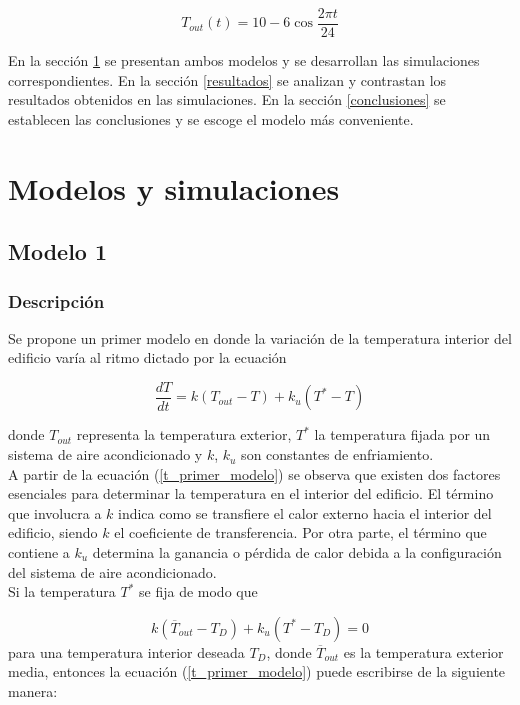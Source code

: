 \documentclass{sig-alternate}
\begin{document}
\begin{equation}
\label{t_exterior}
T_{out} (t) = 10 - 6 \cos\frac{2 \pi t}{24}
\end{equation}

En la secci\'{o}n \ref{modelosysimulaciones} se presentan ambos modelos y
se desarrollan las simulaciones correspondientes.
En la secci\'{o}n \ref{resultados} se analizan y contrastan los resultados
obtenidos en las simulaciones.
En la secci\'{o}n \ref{conclusiones} se establecen las conclusiones y se
escoge el modelo m\'{a}s conveniente.

\section{Modelos y simulaciones}\label{modelosysimulaciones}

\subsection{Modelo 1}

\subsubsection{Descripci\'{o}n}

Se propone un primer modelo en donde la variaci\'{o}n de la temperatura interior
del edificio var\'{i}a al ritmo dictado por la ecuaci\'{o}n

\begin{equation}
\label{t_primer_modelo}
\frac{dT}{dt} = k ( T_{out} - T ) + k_{u} ( T^{*} - T )
\end{equation}

donde $T_{out}$ representa la temperatura exterior, $T^{*}$ la temperatura
fijada por un sistema de aire acondicionado y $k$, $k_{u}$ son constantes
de enfriamiento. \\
A partir de la ecuaci\'{o}n (\ref{t_primer_modelo}) se observa que existen dos
factores esenciales para determinar la temperatura en el interior del edificio.
El t\'{e}rmino que involucra a $k$ indica como se
transfiere el calor externo hacia el interior del edificio, siendo $k$ el
coeficiente de transferencia. Por otra parte, el t\'{e}rmino que contiene a $k_{u}$
 determina la ganancia o p\'{e}rdida de calor debida a la configuraci\'{o}n del 
sistema de aire acondicionado. \\
Si la temperatura $T^{*}$ se fija de modo que 

\begin{equation}
\label{t_fijada}
k ( \overline{T}_{out} - T_{D})
+ k_{u} ( T^{*} - T_{D} ) = 0
\end{equation}
para una temperatura interior deseada $T_{D}$,
donde $\overline{T}_{out}$ es la temperatura exterior media, entonces la
ecuaci\'{o}n (\ref{t_primer_modelo}) puede escribirse de la siguiente manera:
\end{document}
